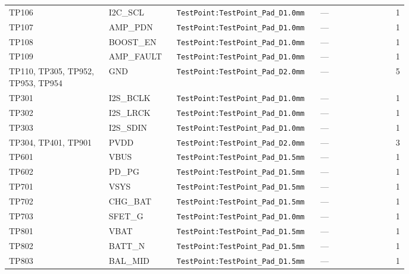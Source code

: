 {\begin{longtable}{@{}>{\raggedright\arraybackslash}p{0.25\linewidth}>{\raggedright\arraybackslash}p{0.17\linewidth}>{\raggedright\arraybackslash}p{0.36\linewidth}l l r@{}}
TP106 & I2C\_SCL & \texttt{TestPoint:\allowbreak{}TestPoint\_\allowbreak{}Pad\_\allowbreak{}D1.0mm} & --- &  & 1\\
TP107 & AMP\_PDN & \texttt{TestPoint:\allowbreak{}TestPoint\_\allowbreak{}Pad\_\allowbreak{}D1.0mm} & --- &  & 1\\
TP108 & BOOST\_EN & \texttt{TestPoint:\allowbreak{}TestPoint\_\allowbreak{}Pad\_\allowbreak{}D1.0mm} & --- &  & 1\\
TP109 & AMP\_FAULT & \texttt{TestPoint:\allowbreak{}TestPoint\_\allowbreak{}Pad\_\allowbreak{}D1.0mm} & --- &  & 1\\
TP110, TP305, TP952, TP953, TP954 & GND & \texttt{TestPoint:\allowbreak{}TestPoint\_\allowbreak{}Pad\_\allowbreak{}D2.0mm} & --- &  & 5\\
TP301 & I2S\_BCLK & \texttt{TestPoint:\allowbreak{}TestPoint\_\allowbreak{}Pad\_\allowbreak{}D1.0mm} & --- &  & 1\\
TP302 & I2S\_LRCK & \texttt{TestPoint:\allowbreak{}TestPoint\_\allowbreak{}Pad\_\allowbreak{}D1.0mm} & --- &  & 1\\
TP303 & I2S\_SDIN & \texttt{TestPoint:\allowbreak{}TestPoint\_\allowbreak{}Pad\_\allowbreak{}D1.0mm} & --- &  & 1\\
TP304, TP401, TP901 & PVDD & \texttt{TestPoint:\allowbreak{}TestPoint\_\allowbreak{}Pad\_\allowbreak{}D2.0mm} & --- &  & 3\\
TP601 & VBUS & \texttt{TestPoint:\allowbreak{}TestPoint\_\allowbreak{}Pad\_\allowbreak{}D1.5mm} & --- &  & 1\\
TP602 & PD\_PG & \texttt{TestPoint:\allowbreak{}TestPoint\_\allowbreak{}Pad\_\allowbreak{}D1.5mm} & --- &  & 1\\
TP701 & VSYS & \texttt{TestPoint:\allowbreak{}TestPoint\_\allowbreak{}Pad\_\allowbreak{}D1.5mm} & --- &  & 1\\
TP702 & CHG\_BAT & \texttt{TestPoint:\allowbreak{}TestPoint\_\allowbreak{}Pad\_\allowbreak{}D1.5mm} & --- &  & 1\\
TP703 & SFET\_G & \texttt{TestPoint:\allowbreak{}TestPoint\_\allowbreak{}Pad\_\allowbreak{}D1.0mm} & --- &  & 1\\
TP801 & VBAT & \texttt{TestPoint:\allowbreak{}TestPoint\_\allowbreak{}Pad\_\allowbreak{}D1.5mm} & --- &  & 1\\
TP802 & BATT\_N & \texttt{TestPoint:\allowbreak{}TestPoint\_\allowbreak{}Pad\_\allowbreak{}D1.5mm} & --- &  & 1\\
TP803 & BAL\_MID & \texttt{TestPoint:\allowbreak{}TestPoint\_\allowbreak{}Pad\_\allowbreak{}D1.5mm} & --- &  & 1\\

\end{longtable}}

